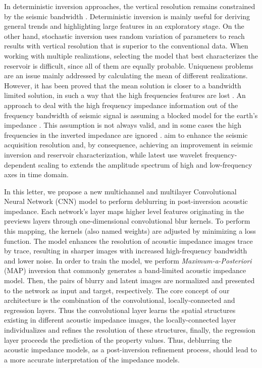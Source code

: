 \documentclass[journal]{IEEEtran}
\begin{document}
In deterministic inversion approaches, the vertical resolution
remains constrained by the seismic bandwidth \cite{Sancevero2005}.
Deterministic inversion is mainly useful for deriving general
trends and highlighting large features in an exploratory stage.
On the other hand, stochastic inversion uses random variation
of parameters to reach results with vertical resolution that is
superior to the conventional data. When working with multiple
realizations, selecting the model that best characterizes the
reservoir is difficult, since all of them are equally probable.
Uniqueness problems are an issue mainly addressed by calculating
the mean of different realizations. However, it has been proved
that the mean solution is closer to a bandwidth limited solution,
in such a way that the high frequencies features are lost
\cite{Cook2010}. An approach to deal with the high frequency
impedance information out of the frequency bandwidth of seismic signal
is assuming a blocked model for the earth's impedance \cite{Cook2010}.
This assumption is not always valid, and in some cases the high
frequencies in the inverted impedance are ignored \cite{YuanWang2015}.
\cite{xiaoiu} aim to enhance the seismic acquisition resolution and, by
consequence, achieving an improvement in seismic inversion and
reservoir characterization, while \cite{ChenWang2018} latest use wavelet
frequency-dependent scaling to extends the amplitude spectrum of
high and low-frequency axes in time domain. 

In this letter, we propose a new multichannel and multilayer
Convolutional Neural Network (CNN) model to perform deblurring
in post-inversion acoustic impedance. Each network's layer maps
higher level features originating in the previews layers through
one-dimensional convolutional blur kernels. To perform this
mapping, the kernels (also named weights) are adjusted by
minimizing a loss function. The model enhances the resolution
of acoustic impedance images trace by trace, resulting in sharper
images with increased high-frequency bandwidth and lower noise.
In order to train the model, we perform \textit{Maximum-a-Posteriori} (MAP)
inversion that commonly generates a band-limited acoustic impedance model.
Then, the pairs of blurry and latent images are normalized and 
presented to the network as input and target, respectively.
The core concept of our architecture is the combination of the
convolutional, locally-connected and regression layers. Thus
the convolutional layer learns the spatial structures existing
in different acoustic impedance images, the locally-connected
layer individualizes and refines the resolution of these structures,
finally, the regression layer proceeds the prediction of the property values.
Thus, deblurring the acoustic impedance models, as a post-inversion
refinement process, should lead to a more accurate interpretation
of the impedance models.
\end{document}
